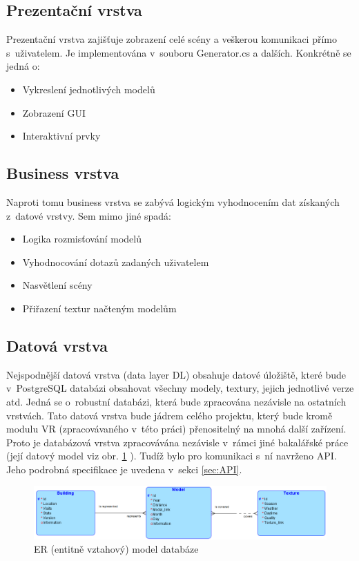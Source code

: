\documentclass[thesis=B,czech]{FITthesis}[2012/06/26]
\begin{document}
	\subsection{Prezentační vrstva}
	Prezentační vrstva zajišťuje zobrazení celé scény a veškerou komunikaci přímo s~uživatelem. Je implementována v~souboru Generator.cs a dalších. Konkrétně se jedná o:
		\begin{itemize}
			\item Vykreslení jednotlivých modelů
			\item Zobrazení GUI
			\item Interaktivní prvky
		\end{itemize}

	\subsection{Business vrstva}	
	 Naproti tomu business vrstva se zabývá logickým vyhodnocením dat získaných z~datové vrstvy. Sem mimo jiné spadá:
	 \begin{itemize}
			\item Logika rozmisťování modelů
			\item Vyhodnocování dotazů zadaných uživatelem
			\item Nasvětlení scény
			\item Přiřazení textur načteným modelům			
		\end{itemize}
	 
	 \subsection{Datová vrstva}
Nejspodnější datová vrstva (data layer DL) obsahuje datové úložiště, které bude v~PostgreSQL databázi obsahovat všechny modely, textury, jejich jednotlivé verze atd. Jedná se o~robustní databázi, která bude zpracována nezávisle na ostatních vrstvách. Tato datová vrstva bude jádrem celého projektu, který bude kromě modulu VR (zpracovávaného v~této práci) přenositelný na mnohá další zařízení. Proto je databázová vrstva zpracovávána nezávisle v~rámci jiné bakalářské práce (její datový model viz obr. \ref{fig:ERmodel} ). Tudíž bylo pro komunikaci s~ní navrženo API. Jeho podrobná specifikace je uvedena v~sekci \ref{sec:API}.
	
	\begin{figure}
  		\includegraphics[width=\textwidth,height=\textheight,keepaspectratio]{ERmodel.png}
  		\caption{ER (entitně vztahový) model databáze \cite{cernyVit}}
  		\label{fig:ERmodel}
	\end{figure}
	
\end{document}

